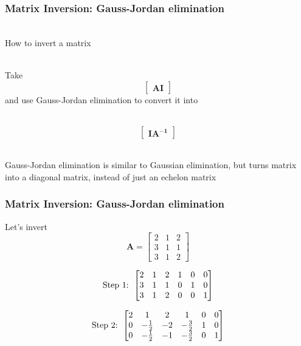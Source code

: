 \documentclass{beamer}
\numberwithin{equation}{section}
\begin{document}
\begin{frame}
\frametitle{Matrix Inversion: Gauss-Jordan elimination}

\ \\How to invert a matrix \pause

\ \\Take $$\begin{bmatrix}\mathbf{A I} \end{bmatrix}$$ and use Gauss-Jordan elimination to convert it into

\ \\$$\begin{bmatrix}\mathbf{I A^{-1}} \end{bmatrix}$$ \pause

\ \\Gauss-Jordan elimination is similar to Gaussian elimination, but turns matrix into a diagonal matrix, instead of just an echelon matrix
\end{frame}



\begin{frame}
\frametitle{Matrix Inversion: Gauss-Jordan elimination}

Let's invert $$\mathbf{A}=\begin{bmatrix}
2&1&2\\
3&1&1\\
3&1&2
\end{bmatrix}$$ \pause

$$\hbox{Step 1: }\begin{bmatrix}
2&1&2& 1& 0& 0\\
3&1&1& 0& 1& 0\\
3&1&2& 0& 0&1
\end{bmatrix}$$ \pause

$$\hbox{Step 2: }\begin{bmatrix}
2&1&2& 1& 0& 0\\
0&- \frac{1}{2} &-2& -\frac{3}{2}&1 & 0\\

0&- \frac{1}{2} &-1& -\frac{3}{2}& 0&1
\end{bmatrix}$$

\end{frame}
\end{document}
